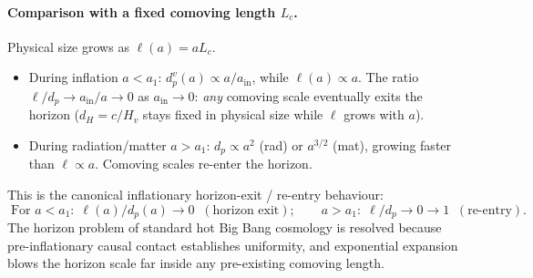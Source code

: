 \documentclass[11pt]{article}
\begin{document}
\paragraph{Comparison with a fixed comoving length $L_c$.} Physical size grows as $\ell(a)=a L_c$.
\begin{itemize}\setlength\itemsep{0pt}
\item During inflation $a<a_1$: $d_p^v(a)\propto a/a_{\mathrm{in}}$, while $\ell(a)\propto a$. The ratio $\ell/d_p\to a_{\mathrm{in}}/a\to 0$ as $a_{\mathrm{in}}\to 0$: {\it any} comoving scale eventually exits the horizon ($d_H=c/H_v$ stays fixed in physical size while $\ell$ grows with $a$).
\item During radiation/matter $a>a_1$: $d_p\propto a^2$ (rad) or $a^{3/2}$ (mat), growing faster than $\ell\propto a$. Comoving scales re-enter the horizon.
\end{itemize}
This is the canonical inflationary horizon-exit / re-entry behaviour:
\[
\boxed{\;\text{For }a<a_1:\;\ell(a)/d_p(a)\to 0\;\;(\text{horizon exit});\qquad a>a_1:\;\ell/d_p\to 0\to 1\;\;(\text{re-entry}).\;}
\]
The horizon problem of standard hot Big Bang cosmology is resolved because pre-inflationary causal contact establishes uniformity, and exponential expansion blows the horizon scale far inside any pre-existing comoving length.
\end{document}
